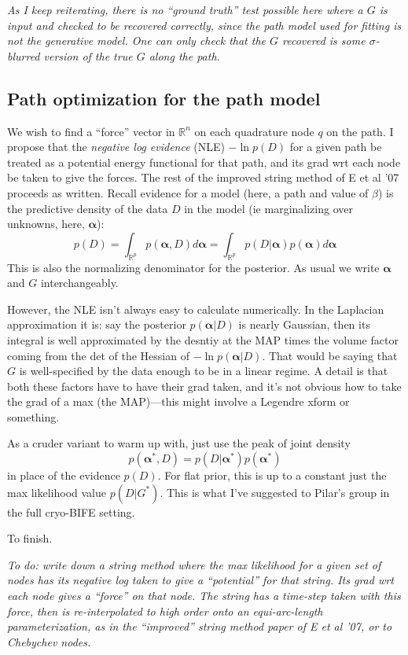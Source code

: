 \documentclass[10pt]{article}
\newcommand{\be}{\begin{equation}}
\newcommand{\ee}{\end{equation}}
\newcommand{\R}{\mathbb{R}}
\newcommand{\bt}{\beta}
\newcommand{\bal}{{\bm\alpha}}
\begin{document}
{\em 
As I keep reiterating, there is no ``ground truth'' test possible here
where a $G$ is input and checked to be recovered correctly,
since the path model used for fitting is not the generative model.
One can only check that the $G$ recovered is some $\sigma$-blurred version
of the true $G$ along the path.
}



\subsection{Path optimization for the path model}

We wish to find a ``force'' vector in $\R^n$ on each quadrature node $q$ on the path.
I propose that the {\em negative log evidence} (NLE) $-\ln p(D)$ for a given
path be treated as a potential energy functional for that path,
and its grad wrt each node be taken to give the forces.
The rest of the improved string method of E et al '07 proceeds as written.
Recall evidence for a model (here, a path and value of $\bt$) is
the predictive density of the data $D$ in the model (ie marginalizing over unknowns, here, $\bal$):
\be
p(D) = \int_{\R^p} p(\bal,D) d\bal = \int_{\R^p} p(D|\bal) p(\bal) d\bal
\ee
This is also the normalizing denominator for the posterior.
As usual we write $\bal$ and $G$ interchangeably.

However, the NLE isn't always easy to calculate numerically.
In the Laplacian approximation it is: say the posterior $p(\bal|D)$ is
nearly Gaussian, then its integral is well approximated by the
desntiy at the MAP times the volume factor coming from the det of the
Hessian of $-\ln p(\bal|D)$.
That would be saying that $G$ is well-specified by the data enough to
be in a linear regime.
A detail is that both these factors have to have their grad taken,
and it's not obvious how to take the grad of a max (the MAP)---this might
involve a Legendre xform or something.

As a cruder variant to warm up with, just use the peak of joint density
$$
p(\bal^\ast,D) = p(D|\bal^\ast) p(\bal^\ast)
$$
in place of the evidence $p(D)$.
For flat prior, this is up to a constant
just the max likelihood value $p(D|G^\ast)$.
This is what I've suggested to Pilar's group in the full cryo-BIFE setting.

To finish.

{\em To do: write down a string method where the max likelihood for a given
  set of nodes has its negative log taken to give a ``potential'' for that string. Its grad wrt each node gives a ``force'' on that node. The string has a time-step taken with this force, then is re-interpolated to high order onto an equi-arc-length parameterization, as in the ``improved'' string method paper of E et al '07, or to Chebychev nodes.}
\end{document}
